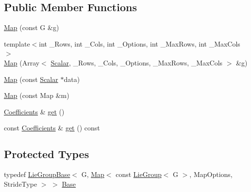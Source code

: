 \subsection*{Public Member Functions}
\begin{DoxyCompactItemize}
\item 
\hyperlink{class_map_3_01const_01_lie_group_3_01_g_01_4_00_01_map_options_00_01_stride_type_01_4_a95174b5f6c93ceefa0fbc6ef6fdf65f7}{Map} (const G \&g)
\item 
{\footnotesize template$<$int \+\_\+\+Rows, int \+\_\+\+Cols, int \+\_\+\+Options, int \+\_\+\+Max\+Rows, int \+\_\+\+Max\+Cols$>$ }\\\hyperlink{class_map_3_01const_01_lie_group_3_01_g_01_4_00_01_map_options_00_01_stride_type_01_4_a5e4ba9f00368b29fdb6d8948d2f56c5b}{Map} (Array$<$ \hyperlink{class_map_3_01const_01_lie_group_3_01_g_01_4_00_01_map_options_00_01_stride_type_01_4_a006635f5fe4155200809ee347f61b9a6}{Scalar}, \+\_\+\+Rows, \+\_\+\+Cols, \+\_\+\+Options, \+\_\+\+Max\+Rows, \+\_\+\+Max\+Cols $>$ \&g)
\item 
\hyperlink{class_map_3_01const_01_lie_group_3_01_g_01_4_00_01_map_options_00_01_stride_type_01_4_a47888b3035c416eb5fadeb6d8e4026a2}{Map} (const \hyperlink{class_map_3_01const_01_lie_group_3_01_g_01_4_00_01_map_options_00_01_stride_type_01_4_a006635f5fe4155200809ee347f61b9a6}{Scalar} $\ast$data)
\item 
\hyperlink{class_map_3_01const_01_lie_group_3_01_g_01_4_00_01_map_options_00_01_stride_type_01_4_a0aadabe587f3f92d994d4a0247bc0f72}{Map} (const Map \&m)
\item 
\hyperlink{class_map_3_01const_01_lie_group_3_01_g_01_4_00_01_map_options_00_01_stride_type_01_4_a670729f8e6ab1131541ef46da7d09274}{Coefficients} \& \hyperlink{class_map_3_01const_01_lie_group_3_01_g_01_4_00_01_map_options_00_01_stride_type_01_4_ab48c4783f796ef888b9c9dc3a78fb35a}{get} ()
\item 
const \hyperlink{class_map_3_01const_01_lie_group_3_01_g_01_4_00_01_map_options_00_01_stride_type_01_4_a670729f8e6ab1131541ef46da7d09274}{Coefficients} \& \hyperlink{class_map_3_01const_01_lie_group_3_01_g_01_4_00_01_map_options_00_01_stride_type_01_4_aa9bd0922b1e369ac08f43921453d330c}{get} () const
\end{DoxyCompactItemize}
\subsection*{Protected Types}
\begin{DoxyCompactItemize}
\item 
typedef \hyperlink{class_lie_group_base}{Lie\+Group\+Base}$<$ G, \hyperlink{class_map_3_01const_01_lie_group_3_01_g_01_4_00_01_map_options_00_01_stride_type_01_4_a95174b5f6c93ceefa0fbc6ef6fdf65f7}{Map}$<$ const \hyperlink{class_lie_group}{Lie\+Group}$<$ G $>$, Map\+Options, Stride\+Type $>$ $>$ \hyperlink{class_map_3_01const_01_lie_group_3_01_g_01_4_00_01_map_options_00_01_stride_type_01_4_ae8127dbfe0e6b6b515d319062f495883}{Base}
\end{DoxyCompactItemize}
